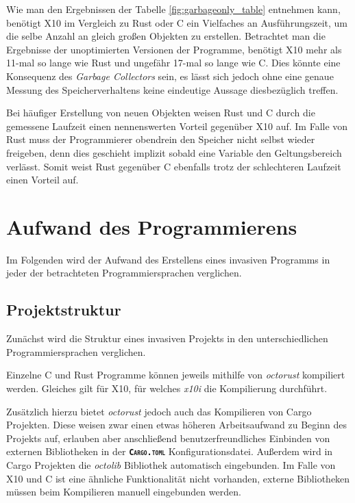 Wie man den Ergebnissen der Tabelle \ref{fig:garbageonly_table} entnehmen kann,
benötigt X10 im Vergleich zu Rust oder C ein Vielfaches an Ausführungszeit, um die selbe Anzahl an gleich großen
Objekten zu erstellen. Betrachtet man die Ergebnisse der unoptimierten Versionen der Programme, benötigt X10
mehr als 11-mal so lange wie Rust und ungefähr 17-mal so lange wie C.
Dies könnte eine Konsequenz des \textit{Garbage Collectors} sein, es lässt sich jedoch ohne eine genaue Messung des
Speicherverhaltens keine eindeutige Aussage diesbezüglich treffen.

Bei häufiger Erstellung von neuen Objekten weisen Rust und C durch die gemessene Laufzeit
einen nennenswerten Vorteil gegenüber X10 auf. Im Falle von Rust muss der Programmierer obendrein
den Speicher nicht selbst wieder freigeben, denn dies geschieht implizit sobald eine Variable
den Geltungsbereich verlässt. Somit weist Rust gegenüber C ebenfalls trotz der schlechteren Laufzeit
einen Vorteil auf.

\section{Aufwand des Programmierens}

Im Folgenden wird der Aufwand des Erstellens eines invasiven Programms in jeder der betrachteten
Programmiersprachen verglichen.

\subsection{Projektstruktur}

Zunächst wird die Struktur eines invasiven Projekts in den unterschiedlichen Programmiersprachen verglichen.

Einzelne C und Rust Programme können jeweils mithilfe von \textit{octorust} kompiliert werden.
Gleiches gilt für X10, für welches \textit{x10i} die Kompilierung durchführt.

Zusätzlich hierzu bietet \textit{octorust} jedoch auch das Kompilieren von Cargo Projekten.
Diese weisen zwar einen etwas
höheren Arbeitsaufwand zu Beginn des Projekts auf, erlauben aber anschließend benutzerfreundliches Einbinden von
externen Bibliotheken in der \texttt{\textsc{\textbf{Cargo.toml}}} Konfigurationsdatei. Außerdem wird in Cargo Projekten
die \textit{octolib} Bibliothek automatisch eingebunden. Im Falle von X10 und C ist eine ähnliche
Funktionalität nicht vorhanden, externe Bibliotheken müssen beim Kompilieren manuell eingebunden werden.


